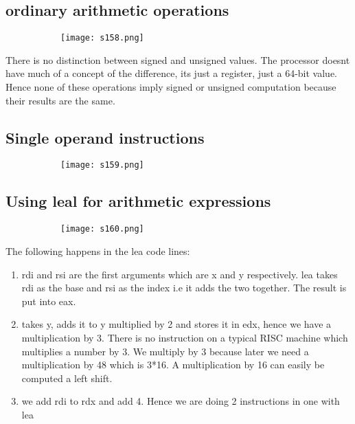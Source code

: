 \documentclass[8pt]{extreport}
\begin{document}
\subsection{ordinary arithmetic operations}
\begin{figure}[H]
\centering
\begin{subfigure}[b]{0.4\linewidth}
\texttt{[image: s158.png]}
\end{subfigure}
\end{figure}
There is no distinction between signed and unsigned values. The processor doesnt have much of a concept of the difference, its just a register, just a 64-bit value. Hence none of these operations imply signed or unsigned computation because their results are the same.
\subsection{Single operand instructions}
\begin{figure}[H]
\centering
\begin{subfigure}[b]{0.4\linewidth}
\texttt{[image: s159.png]}
\end{subfigure}
\end{figure}

\subsection{Using leal for arithmetic expressions}
\begin{figure}[H]
\centering
\begin{subfigure}[b]{0.4\linewidth}
\texttt{[image: s160.png]}
\end{subfigure}
\end{figure}
The following happens in the lea code lines:
\begin{enumerate}
\item rdi and rsi are the first arguments which are x and y respectively. lea takes rdi as the base and rsi as the index i.e it adds the two together. The result is put into eax.
\item takes y, adds it to y multiplied by 2 and stores it in edx, hence we have a multiplication by 3. There is no instruction on a typical RISC machine which multiplies a number by 3. We multiply by 3 because later we need a multiplication by 48 which is 3*16. A multiplication by 16 can easily be computed a left shift.
\item we add rdi to rdx and add 4. Hence we are doing 2 instructions in one with lea
\end{enumerate}
\end{document}
